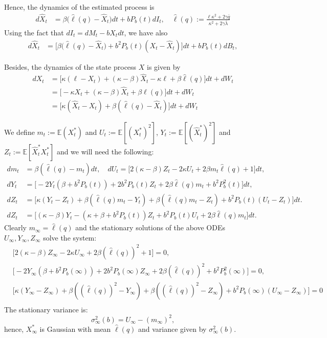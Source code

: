 \documentclass[a4paper,10pt]{article}
\theoremstyle{definition}
\theoremstyle{plain}
\numberwithin{equation}{section}
\newcommand{\hs}{\vspace{3mm}}
\begin{document}
Hence, the dynamics of the estimated process is
\begin{align*}
d\hat X_t  & = \beta\big(\hat\ell(q) - \hat X_t\big) dt + b P_b(t) dI_t, \quad \hat\ell(q) := \frac{\ell \kappa^2 + 2\gamma \bar q}{\kappa^2 + 2\gamma\bar\lambda}
\end{align*}
Using the fact that $dI_t = dM_t - b\hat X_t dt$, we have also
\begin{align*}
d\hat X_t  & = \big[ \beta\big(\hat\ell(q) - \hat X_t\big) + b^2 P_b(t)(X_t - \hat X_t) \big]dt + b P_b(t) dB_t, 
\end{align*}

Besides, the dynamics of the state process $X$ is given by
\begin{align*}
dX_t  & = \big[ \kappa(\ell - X_t) + (\kappa - \beta) \hat X_t - \kappa\ell + \beta \hat\ell(q) \big] dt + dW_t \\
& =  \big[- \kappa X_t + (\kappa - \beta) \hat X_t  + \beta \hat\ell(q) \big] dt + dW_t \\
& = \big[ \kappa(\hat X_t - X_t) + \beta(\hat\ell(q) - \hat X_t)\big] dt + dW_t
\end{align*}

We define $m_t:= \mathbb E (X_t^*)$ and $U_t := \mathbb E [{(X_t^*)}^2] $, $Y_t := \mathbb E [{(\widehat X_t^*)}^2] $ and $Z_t := \mathbb E [ \widehat X_t^* X_t^*] $ and we will need the following:
\begin{align*}
d m_t & = \beta( \hat\ell(q) - m_t) dt, \quad
d U_t  =  \big[2 (\kappa - \beta) Z_t - 2 \kappa U_t + 2 \beta m_t  \hat\ell(q) +1 \big] dt, \\
d Y_t & = \big[-  2 Y_t (\beta + b^2 P_b(t)) + 2 b^2 P_b(t) Z_t + 2 \beta  \hat \ell(q) m_t + b^2 P_b^2(t)\big] dt, \\
dZ_t &  = \big[ \kappa(Y_t - Z_t) + \beta(\hat\ell(q) m_t - Y_t)  + \beta(\hat\ell(q)m_t - Z_t) 
+ b^2P_b(t)(U_t  - Z_t) \big] dt. \\
dZ_t  & = \big[ (\kappa-\beta) Y_t - (\kappa+\beta + b^2 P_b(t)) Z_t 
+ b^2 P_b(t) U_t + 2 \beta\hat\ell(q) m_t \big] dt.
\end{align*}
Clearly $m_\infty  =  \hat\ell(q)$  and the stationary solutions of the above ODEs $U_\infty, Y_\infty,Z_\infty$ solve the system:
\begin{align*}
& \big[2 (\kappa - \beta) Z_\infty - 2 \kappa U_\infty + 2 \beta  (\hat\ell(q))^2 +1 \big] =0 , \\
& \big[-  2 Y_\infty (\beta + b^2 P_b(\infty)) + 2 b^2 P_b(\infty) Z_\infty + 2 \beta  (\hat \ell(q))^2 + b^2 P_b^2(\infty)\big] =0 , \\
& \big[ \kappa(Y_\infty - Z_\infty) + \beta( (\hat\ell(q))^2 - Y_\infty)  + \beta((\hat\ell(q))^2 - Z_\infty) +b^2P_b(\infty)(U_\infty  - Z_\infty) \big]  = 0\\ 
\end{align*}
The stationary variance is:
$$
\sigma^2_\infty(b) = U_\infty- (m_\infty)^2,
$$
hence, $X^\ast_\infty$ is Gaussian with mean $\hat\ell(q)$ and variance given by $\sigma^2_\infty(b)$. 
\hs
\end{document}
